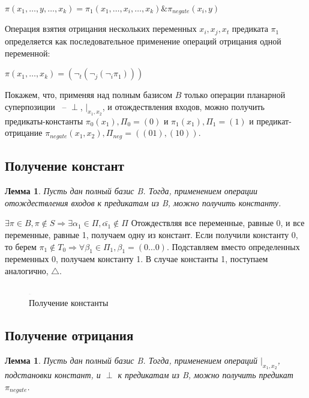 \documentclass[12pt]{article}
\newtheorem{lemma}[theorem]{Лемма}
\newenvironment{proof}[1][Доказательство]{\begin{trivlist}
\item[\hskip \labelsep {\bfseries #1}]}{\end{trivlist}}
\begin{document}
$\pi(x_1, \dots, y, \dots, x_k) = \pi_1(x_1, \dots, x_i, \dots, x_k) \& \pi_{negate}(x_i, y)$

Операция взятия отрицания нескольких переменных $x_i, x_j, x_t$ предиката $\pi_1$
определяется как последовательное применение операций отрицания одной переменной:

$\pi(x_1, \dots, x_k) = (\neg_t (\neg_j (\neg_i \pi_1)))$

Покажем, что, применяя над полным базисом $B$ только операции планарной суперпозиции ~-- $\perp$, $|_{x_1, x_2}$,
и отождествления входов, можно получить предикаты-константы
$\pi_0(x_1), \Pi_0=(0)$ и $\pi_1(x_1), \Pi_1=(1)$ и предикат-отрицание $\pi_{negate}(x_1, x_2), \Pi_{neg}=( (01), (10) )$.

\subsection{Получение констант}
\begin{lemma}
\label{eq:const}
Пусть дан полный базис B. Тогда, применением операции отождествления входов к предикатам из B,
можно получить константу.
\end{lemma}

\begin{proof}
$\exists \pi \in B, \pi \notin S \Rightarrow \exists \alpha_1 \in \Pi, \bar{\alpha_1} \notin \Pi$
Отождествляя все переменные, равные 0, и все переменные, равные 1, получаем одну из констант.
Если получили константу 0, то берем $\pi_1 \notin T_0 \Rightarrow \forall \beta_1 \in \Pi_1, \beta_1=(0 \ldots 0)$. 
Подставляем вместо определенных переменных 0, получаем константу 1. 
В случае константы 1, поступаем аналогично, $\bigtriangleup$.
\end{proof}
\begin{figure}[htb]
\centering
\includegraphics[width=0.01\textwidth]{3_2to3.png}
\caption{Получение константы}
\label{fig:constant}
\end{figure}

\subsection{Получение отрицания}
\begin{lemma}
\label{eq:negate}
Пусть дан полный базис B. Тогда, применением операций $|_{x_1, x_2}$, подстановки констант,
и $\perp$ к предикатам из B, можно получить предикат $\pi_{negate}$.
\end{lemma}
\end{document}
